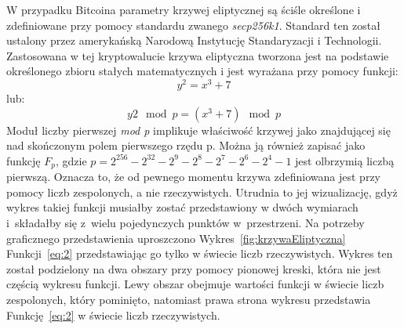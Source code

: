 \documentclass[12pt, oneside, final, openany]{mgr}
\begin{document}
\indent W przypadku Bitcoina parametry krzywej eliptycznej są ściśle określone i zdefiniowane przy pomocy standardu zwanego \textit{secp256k1}. Standard ten został ustalony przez amerykańską Narodową Instytucję Standaryzacji i Technologii. Zastosowana w tej kryptowalucie krzywa eliptyczna tworzona jest na podstawie określonego zbioru stałych matematycznych i jest wyrażana przy pomocy funkcji:
\begin{equation}
  y^2 = x^3 + 7 
\end{equation} 
\label{eq:2}
lub:
\begin{equation} 
\label{eq:3}
  y2 \mod p = (x^3 + 7) \mod p
\end{equation}
Moduł liczby pierwszej \textit{mod p} implikuje właściwość krzywej jako znajdującej się nad skończonym polem pierwszego rzędu p. Można ją również zapisać jako funkcję $F_p$, gdzie $p = 2^{256} - 2^{32} - 2^9 - 2^8 - 2^7 - 2^6 - 2^4 - 1$ jest olbrzymią liczbą pierwszą. Oznacza to, że od pewnego momentu krzywa zdefiniowana jest przy pomocy liczb zespolonych, a nie rzeczywistych. Utrudnia to jej wizualizację, gdyż wykres takiej funkcji musiałby zostać przedstawiony w dwóch wymiarach i~składałby się z~wielu pojedynczych punktów w~przestrzeni. Na potrzeby graficznego przedstawienia uproszczono Wykres~\ref{fig:krzywaEliptyczna} Funkcji~\ref{eq:2} przedstawiając go tylko w świecie liczb rzeczywistych. Wykres ten został podzielony na dwa obszary przy pomocy pionowej kreski, która nie jest częścią wykresu funkcji. Lewy obszar obejmuje wartości funkcji w świecie liczb zespolonych, który pominięto, natomiast prawa strona wykresu przedstawia Funkcję~\ref{eq:2} w świecie liczb rzeczywistych.
\end{document}
